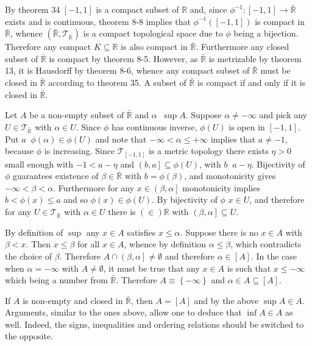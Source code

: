 \documentclass[a4paper]{article}
\newcommand{\obj}[1]{\left\{ #1 \right \}}
\newcommand{\clo}[1]{\left [ #1 \right ]}
\newcommand{\ploc}[1]{\left ( #1 \right ]}
\newcommand{\brac}[1]{\left ( #1 \right )}
\newcommand{\Rbar}{{\bar{\mathbb{R}}}}
\newcommand{\Real}{\mathbb{R}}
\newcommand{\Tcal}{\mathcal{T}}
\newcommand{\defn}{\mathop{\overset{\Delta}{=}}\nolimits}
\begin{document}
By theorem 34 $\clo{-1,1}$ is a compact subset of $\Real$ and, since $\phi^{-1}:\clo{-1,1}\to\Rbar$ exists and is continuous, theorem 8-8 implies that $\phi^{-1}\brac{\clo{-1,1}}$ is compact in $\Rbar$, whence $\brac{\Rbar, \Tcal_\Rbar}$ is a compact topological space due to $\phi$ being a bijection. Therefore any compact $K\subseteq \Real$ is also compact in $\Rbar$. Furthermore any closed subset of $\Rbar$ is compact by theorem 8-5. However, as $\Rbar$ is metrizable by theorem 13, it is Hausdorff by theorem 8-6, whence any compact subset of $\Rbar$ must be closed in $\Rbar$ according to theorem 35. A subset of $\Rbar$ is compact if and only if it is closed in $\Rbar$.

Let $A$ be a non-empty subset of $\Rbar$ and $\alpha\defn \sup A$. Suppose $\alpha\neq-\infty$ and pick any $U\in \Tcal_\Rbar$ with $\alpha\in U$. Since $\phi$ has continuous inverse, $\phi\brac{U}$ is open in $\clo{-1,1}$. Put $a\defn \phi\brac{\alpha} \in \phi\brac{U}$ and note that $-\infty<\alpha\leq+\infty$ implies that $a\neq-1$, because $\phi$ is increasing. Since $\Tcal_{\clo{-1,1}}$ is a metric topology there exists $\eta>0$ small enough with $-1<a-\eta$ and $\ploc{b,a} \subseteq \phi\brac{U}$, with $b\defn a-\eta$. Bijectivity of $\phi$ guarantees existence of $\beta\in \Rbar$ with $b=\phi\brac{\beta}$, and monotonicity gives $-\infty<\beta<\alpha$. Furthermore for any $x\in \ploc{\beta,\alpha}$ monotonicity implies $b<\phi\brac{x}\leq a$ and so $\phi\brac{x}\in\phi\brac{U}$. By bijectivity of $\phi$ $x\in U$, and therefore for any $U\in \Tcal_\Rbar$ with $\alpha\in U$ there is $\brac\in \Real$ with $\ploc{\beta, \alpha}\subseteq U$.

By definition of $\sup$ any $x\in A$ satisfies $x\leq \alpha$. Suppose there is no $x\in A$ with $\beta < x$. Then $x\leq \beta$ for all $x\in A$, whence by definition $\alpha\leq \beta$, which contradicts the choice of $\beta$. Therefore $A\cap\ploc{\beta,\alpha}\neq \emptyset$ and therefore $\alpha\in \clo{A}$. In the case when $\alpha=-\infty$ with $A\neq \emptyset$, it must be true that any $x\in A$ is such that $x\leq -\infty$ which being a number from $\Rbar$. Therefore $A\equiv \obj{-\infty}$ and $\alpha\in A\subseteq\clo{A}$.

If $A$ is non-empty and closed in $\Rbar$, then $A=\clo{A}$ and by the above $\sup A\in A$. Arguments, similar to the ones above, allow one to deduce that $\inf A\in A$ as well. Indeed, the signs, inequalities and ordering relations should be switched to the opposite.
\end{document}

